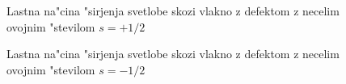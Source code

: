\documentclass[12pt,twoside,openright,final]{report}
\begin{document}
\begin{figure}[!htbp]
 \centering
 \caption{Lastna na"cina "sirjenja svetlobe skozi vlakno z defektom z necelim ovojnim "stevilom $s=+1/2$}
 \label{fig:pulse-p12-mode}
\end{figure}

\begin{figure}[!htbp]
 \centering
 \caption{Lastna na"cina "sirjenja svetlobe skozi vlakno z defektom z necelim ovojnim "stevilom $s=-1/2$}
 \label{fig:pulse-m12-mode}
\end{figure}
\end{document}
